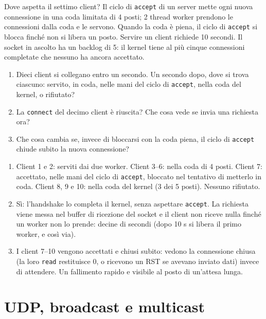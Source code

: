 \begin{esercizio}{Dove aspetta il settimo client?}
Il ciclo di \texttt{accept} di un server mette ogni nuova connessione in una coda limitata di 4 posti; 2 thread worker prendono le
connessioni dalla coda e le servono. Quando la coda è piena, il ciclo di \texttt{accept} si blocca finché non si libera un posto. Servire
un client richiede 10 secondi. Il socket in ascolto ha un backlog di 5: il kernel tiene al più cinque connessioni completate che nessuno ha
ancora accettato.
\begin{enumerate}[label=(\alph*)]
    \item Dieci client si collegano entro un secondo. Un secondo dopo, dove si trova ciascuno: servito, in coda, nelle mani del ciclo di
          \texttt{accept}, nella coda del kernel, o rifiutato?
    \item La \texttt{connect} del decimo client è riuscita? Che cosa vede se invia una richiesta ora?
    \item Che cosa cambia se, invece di bloccarsi con la coda piena, il ciclo di \texttt{accept} chiude subito la nuova connessione?
\end{enumerate}

\svolgimento
\begin{enumerate}[label=(\alph*)]
    \item Client 1 e 2: serviti dai due worker. Client 3--6: nella coda di 4 posti. Client 7: accettato, nelle mani del ciclo di
          \texttt{accept}, bloccato nel tentativo di metterlo in coda. Client 8, 9 e 10: nella coda del kernel (3 dei 5 posti). Nessuno
          rifiutato.
    \item Sì: l'handshake lo completa il kernel, senza aspettare \texttt{accept}. La richiesta viene messa nel buffer di ricezione del
          socket e il client non riceve nulla finché un worker non lo prende: decine di secondi (dopo 10 s si libera il primo worker, e
          così via).
    \item I client 7--10 vengono accettati e chiusi subito: vedono la connessione chiusa (la loro \texttt{read} restituisce 0, o ricevono
          un RST se avevano inviato dati) invece di attendere. Un fallimento rapido e visibile al posto di un'attesa lunga.
\end{enumerate}
\end{esercizio}

\section{UDP, broadcast e multicast}

